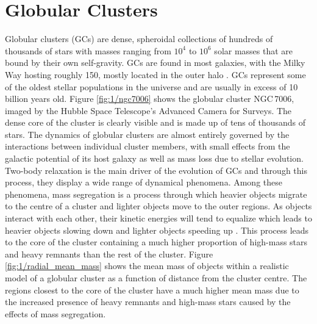 

\section{Globular Clusters}


Globular clusters (GCs) are dense, spheroidal collections of hundreds of thousands of stars with
masses ranging from $10^4$ to $10^6$ solar masses that are bound by their own self-gravity. GCs are
found in most galaxies, with the Milky Way hosting roughly 150, mostly located in the outer halo
\citep[e.g.][]{Heggie2003}. GCs represent some of the oldest stellar populations in the universe and
are usually in excess of 10 billion years old. Figure \ref{fig:1/ngc7006} shows the globular cluster
NGC\,7006, imaged by the Hubble Space Telescope's Advanced Camera for Surveys. The dense core of the
cluster is clearly visible and is made up of tens of thousands of stars. The dynamics of globular
clusters are almost entirely governed by the interactions between individual cluster members, with
small effects from the galactic potential of its host galaxy as well as mass loss due to stellar
evolution. Two-body relaxation is the main driver of the evolution of GCs and through this process,
they display a wide range of dynamical phenomena. Among these phenomena, mass segregation is a
process through which heavier objects migrate to the centre of a cluster and lighter objects move to
the outer regions. As objects interact with each other, their kinetic energies will tend to equalize
which leads to heavier objects slowing down and lighter objects speeding up
\citep[e.g.][]{Heggie2003}. This process leads to the core of the cluster containing a much higher
proportion of high-mass stars and heavy remnants than the rest of the cluster. Figure
\ref{fig:1/radial_mean_mass} shows the mean mass of objects within a realistic model of a globular
cluster as a function of distance from the cluster centre. The regions closest to the core of the
cluster have a much higher mean mass due to the increased presence of heavy remnants and high-mass
stars caused by the effects of mass segregation.

